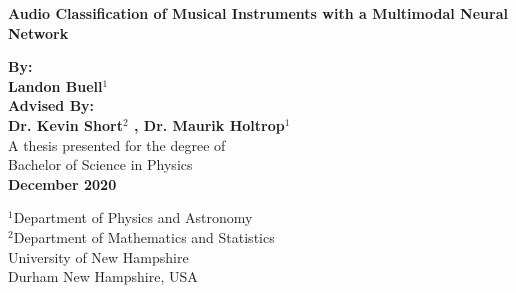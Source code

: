 \documentclass[12pt,letterpaper]{article}
\begin{document}

\begin{titlepage}
	\begin{center}
   		\vspace*{1cm}
       	\begin{LARGE}
       	\textbf{Audio Classification of Musical Instruments with a Multimodal Neural Network} \\
       	\end{LARGE}
       	\vspace{6cm}

       	\textbf{By: \\ Landon Buell$^1$} \\       
       	\vspace{0.5cm}
       	\textbf{Advised By: \\ Dr. Kevin Short$^2$ , Dr. Maurik Holtrop$^1$} \\
      	\vspace{1cm}
      	A thesis presented for the degree of\\
       	Bachelor of Science in Physics \\
       	\vspace{0.5cm}
       	\textbf{December 2020}
        \vspace{1cm}

       	\vfill
      
       	\vspace{1cm}              
       	$^1$Department of Physics and Astronomy\\           
       	$^2$Department of Mathematics and Statistics\\
       	\vspace{0.5cm}  
       	University of New Hampshire\\
       	Durham New Hampshire, USA\\            
   \end{center}
\end{titlepage}


\newpage 
 
\end{document}
